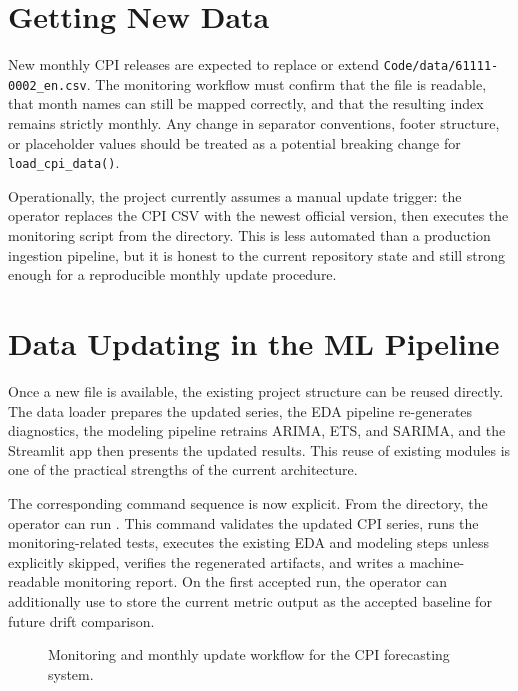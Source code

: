 \section{Getting New Data}

New monthly CPI releases are expected to replace or extend \texttt{Code/data/61111-0002\_en.csv}. The monitoring workflow must confirm that the file is readable, that month names can still be mapped correctly, and that the resulting index remains strictly monthly. Any change in separator conventions, footer structure, or placeholder values should be treated as a potential breaking change for \texttt{load\_cpi\_data()}.

Operationally, the project currently assumes a manual update trigger: the operator replaces the CPI CSV with the newest official version, then executes the monitoring script from the  directory. This is less automated than a production ingestion pipeline, but it is honest to the current repository state and still strong enough for a reproducible monthly update procedure.

\section{Data Updating in the ML Pipeline}

Once a new file is available, the existing project structure can be reused directly. The data loader prepares the updated series, the EDA pipeline re-generates diagnostics, the modeling pipeline retrains ARIMA, ETS, and SARIMA, and the Streamlit app then presents the updated results. This reuse of existing modules is one of the practical strengths of the current architecture.

The corresponding command sequence is now explicit. From the  directory, the operator can run . This command validates the updated CPI series, runs the monitoring-related tests, executes the existing EDA and modeling steps unless explicitly skipped, verifies the regenerated artifacts, and writes a machine-readable monitoring report. On the first accepted run, the operator can additionally use  to store the current metric output as the accepted baseline for future drift comparison.

\begin{figure}[htbp]
	\centering
	
	\caption{Monitoring and monthly update workflow for the CPI forecasting system.}
	\label{fig:monitoring-flow}
\end{figure}

